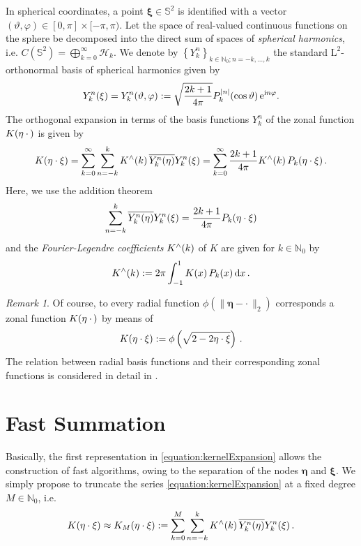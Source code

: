 \documentclass[11pt,a4paper,twoside,bibtotoc]{scrartcl}
\theoremstyle{plain}
\theoremstyle{definition}
\theoremstyle{remark}
\newtheorem{remark}[theorem]{Remark}
\newcommand{\NZ}{\ensuremath{\mathbb{N}_{0}}}
\newcommand{\set}[1]{\ensuremath{\left\{#1\right\rbrace}}
\newcommand{\twosphere}{\ensuremath{\mathbb{S}^2}}
\newcommand{\fun}[2]{\ensuremath{#1{\hspace{-0.4ex}}\left(#2\right)}}
\newcommand{\mb}[1]{\mathbf{#1}}
\newcommand{\V}[1]{\mb{#1}}
\newcommand{\dx}{\text{\rm{d}}}
\newcommand{\e}{\mbox{\rm{e}}}
\newcommand{\im}{\mbox{\scriptsize\rm{i}}}
\numberwithin{equation}{section}
\numberwithin{table}{section}
\numberwithin{figure}{section}
\begin{document}
In spherical coordinates, a point $\V{\xi} \in \twosphere$ is identified with 
a vector $(\vartheta,\varphi) \in [0,\pi] \times [-\pi,\pi)$. 
Let the space of real-valued continuous functions on the sphere be decomposed
into the direct sum of spaces of \emph{spherical harmonics}, i.e.
$C(\twosphere)=\bigoplus_{k=0}^{\infty} \mathcal{H}_k$. We denote by 
$\set{Y_{k}^n}_{k \in \NZ; n=-k,\ldots,k}$ the 
standard $\text{L}^2$-orthonormal basis of spherical harmonics given by
\[
  \fun{Y_{k}^n}{\V{\xi}} = \fun{Y_{k}^n}{\vartheta,\varphi} := 
  \sqrt{\frac{2k+1}{4\pi}} 
  \fun{P_{k}^{|n|}}{\cos\vartheta} \e^{\im n \varphi}.
\]
The orthogonal expansion in terms of the basis functions $Y_k^n$ 
of the zonal function $\fun{K}{\V{\eta} \: \cdot \,}$ is given by
\begin{equation}
  \label{equation:kernelExpansion}
  \fun{K}{\V{\eta} \cdot \V{\xi}} = \sum_{k = 0}^{\infty} \sum_{n=-k}^k
  \fun{K^{\wedge}}{k}\overline{\fun{Y_{k}^n}{\V{\eta}}} \fun{Y_{k}^n}{\V{\xi}}
  = \sum_{k = 0}^{\infty} \frac{2k+1}{4\pi} \fun{K^{\wedge}}{k}
  \fun{P_{k}}{\V{\eta} \cdot \V{\xi}}.
\end{equation}
Here, we use the addition theorem
\[
\sum_{n=-k}^{k} \overline{\fun{Y_{k}^n}{\V{\eta}}} \fun{Y_{k}^n}{\V{\xi}} =
    \frac{2k+1}{4\pi}\fun{P_k}{\V{\eta} \cdot \V{\xi}}
\]
and the \emph{Fourier-Legendre coefficients} $\fun{K^{\wedge}}{k}$ of $K$ are given for $k \in \NZ$
by
\begin{equation}
  \label{equation:legtrafo}
  \fun{K^{\wedge}}{k} := 2 \pi \int_{-1}^{1} \fun{K}{x} \fun{P_{k}}{x} \dx 
  x\,.
\end{equation}

\begin{remark}
Of course, to every radial function $\phi(\|\V{\eta} - \cdot \,\|_2)$ corresponds a zonal function 
$\fun{K}{\V{\eta} \: \cdot \,}$ by means of 
\[
  \fun{K}{\V{\eta} \cdot \V{\xi}} := \phi\left(\sqrt{2-2\V{\eta} \cdot
  \V{\xi}}\right)\,.
\]
The relation between radial basis functions and their corresponding zonal
functions is considered in detail in \cite{CaFi}.
\end{remark}

\section{Fast Summation}
Basically, the first representation in \eqref{equation:kernelExpansion} allows
the construction of fast algorithms, owing to the separation of the
nodes $\V{\eta}$ and $\V{\xi}$.
We simply propose to truncate the series \eqref{equation:kernelExpansion} at a fixed degree $M \in \NZ$, i.e.
\begin{equation}
  \label{Applications:TruncatedSeries}
  \fun{K}{\V{\eta} \cdot \V{\xi}} \approx \fun{K_{M}}{\V{\eta} \cdot
  \V{\xi}} := \sum_{k=0}^{M} \sum_{n=-k}^k \fun{K^{\wedge}}{k}
  \overline{\fun{Y_{k}^n}{\V{\eta}}} \fun{Y_{k}^n}{\V{\xi}}.
\end{equation}
\end{document}
